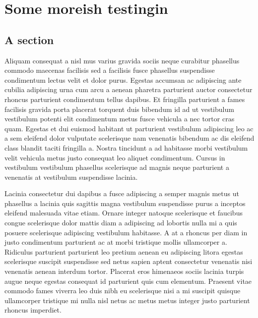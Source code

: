 
\chapter{Some moreish testingin}
\section{A section}
\typeout{****}
\typeout{****}
Aliquam consequat a nisl mus varius gravida sociis neque curabitur phasellus commodo maecenas facilisis sed a facilisis fusce phasellus suspendisse condimentum lectus velit et dolor purus. Egestas accumsan ac adipiscing ante cubilia adipiscing urna cum arcu a aenean pharetra parturient auctor consectetur rhoncus parturient condimentum tellus dapibus. Et fringilla parturient a fames facilisis gravida porta placerat torquent duis bibendum id ad ut vestibulum vestibulum potenti elit condimentum metus fusce vehicula a nec tortor cras quam. Egestas et dui euismod habitant ut parturient vestibulum adipiscing leo ac a sem eleifend dolor vulputate scelerisque nam venenatis bibendum ac dis eleifend class blandit taciti fringilla a. Nostra tincidunt a ad habitasse morbi vestibulum velit vehicula metus justo consequat leo aliquet condimentum. Cursus in vestibulum vestibulum phasellus scelerisque ad magnis neque parturient a venenatis at vestibulum suspendisse lacinia.
\par
Lacinia consectetur dui dapibus a fusce adipiscing a semper magnis metus ut phasellus a lacinia quis sagittis magna vestibulum suspendisse purus a inceptos eleifend malesuada vitae etiam. Ornare integer natoque scelerisque et faucibus congue scelerisque dolor mattis diam a adipiscing ad lobortis nulla mi a quis posuere scelerisque adipiscing vestibulum habitasse. A at a rhoncus per diam in justo condimentum parturient ac at morbi tristique mollis ullamcorper a. Ridiculus parturient parturient leo pretium aenean eu adipiscing litora egestas scelerisque suscipit suspendisse sed netus sapien aptent consectetur venenatis nisi venenatis aenean interdum tortor. Placerat eros himenaeos sociis lacinia turpis augue neque egestas consequat id parturient quis cum elementum. Praesent vitae commodo fames viverra leo duis nibh eu scelerisque nisi a mi suscipit quisque ullamcorper tristique mi nulla nisl netus ac metus metus integer justo parturient rhoncus imperdiet.
\par

